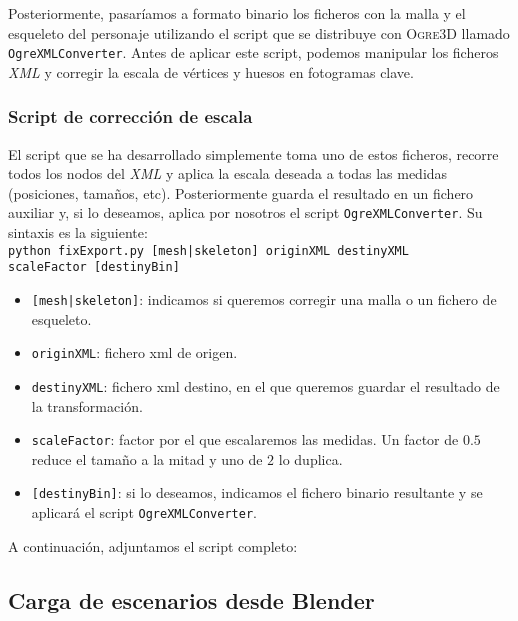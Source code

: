 

Posteriormente, pasaríamos a formato binario los ficheros con la malla y el
esqueleto del personaje utilizando el script que se distribuye con \textsc{Ogre3D}
llamado \texttt{OgreXMLConverter}. Antes de aplicar este script, podemos
manipular los ficheros \textit{XML} y corregir la escala de vértices y huesos
en fotogramas clave.\\

\subsubsection{Script de corrección de escala}

El script que se ha desarrollado simplemente toma uno de estos ficheros,
recorre todos los nodos del \textit{XML} y aplica la escala deseada
a todas las medidas (posiciones, tamaños, etc). Posteriormente guarda
el resultado en un fichero auxiliar y, si lo deseamos, aplica por nosotros
el script \texttt{OgreXMLConverter}. Su sintaxis es la siguiente:\\

\texttt{python fixExport.py [mesh|skeleton] originXML destinyXML \\scaleFactor [destinyBin]}

\begin{itemize}
    \itemsep0em
    \item \texttt{[mesh|skeleton]}: indicamos si queremos corregir una
    malla o un fichero de esqueleto.
    \item \texttt{originXML}: fichero xml de origen.
    \item \texttt{destinyXML}: fichero xml destino, en el que queremos
    guardar el resultado de la transformación.
    \item \texttt{scaleFactor}: factor por el que escalaremos las medidas.
    Un factor de $0.5$ reduce el tamaño a la mitad y uno de $2$ lo duplica.
    \item \texttt{[destinyBin]}: si lo deseamos, indicamos el fichero binario
    resultante y se aplicará el script \texttt{OgreXMLConverter}.
\end{itemize}

A continuación, adjuntamos el script completo:\\



\subsection{Carga de escenarios desde Blender}

